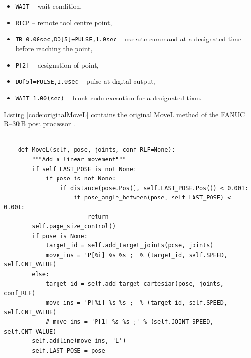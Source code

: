 \begin{itemize}

    \item \texttt{WAIT} -- wait condition,
    \item \texttt{RTCP} -- remote tool centre point,
    \item \texttt{TB  0.00sec,DO[5]=PULSE,1.0sec} -- execute command at a designated time before reaching the point,
    \item \texttt{P[2]} -- designation of point,
    \item \texttt{DO[5]=PULSE,1.0sec} -- pulse at digital output,
    \item \texttt{WAIT  1.00(sec)} -- block code execution for a designated time.

\end{itemize}

Listing \ref{code:originalMoveL} contains the original MoveL method of the FANUC R--30iB post processor \cite{postmethods}. 


\label{code:originalMoveL}
\begin{verbatim}

    def MoveL(self, pose, joints, conf_RLF=None):
        """Add a linear movement"""
        if self.LAST_POSE is not None:
            if pose is not None:
                if distance(pose.Pos(), self.LAST_POSE.Pos()) < 0.001:
                    if pose_angle_between(pose, self.LAST_POSE) < 0.001:
                        return
        self.page_size_control()
        if pose is None:
            target_id = self.add_target_joints(pose, joints)
            move_ins = 'P[%i] %s %s ;' % (target_id, self.SPEED, self.CNT_VALUE)
        else:
            target_id = self.add_target_cartesian(pose, joints, conf_RLF)
            move_ins = 'P[%i] %s %s ;' % (target_id, self.SPEED, self.CNT_VALUE)
            # move_ins = 'P[1] %s %s ;' % (self.JOINT_SPEED, self.CNT_VALUE)
        self.addline(move_ins, 'L')
        self.LAST_POSE = pose

\end{verbatim}





